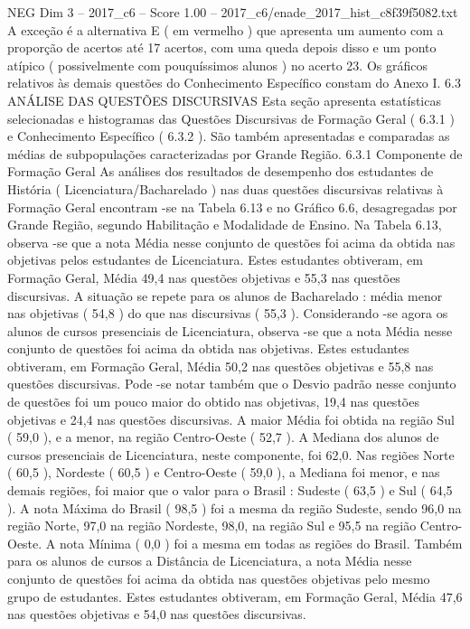 \begin{textsample}{NEG Dim 3 – 2017\_c6 – Score 1.00 – 2017\_c6/enade\_2017\_hist\_c8f39f5082.txt}
A exceção é a alternativa E ( em vermelho ) que apresenta um aumento com a proporção de acertos até 17 acertos, com uma queda depois disso e um ponto atípico ( possivelmente com pouquíssimos alunos ) no acerto 23.
Os gráficos relativos às demais questões do Conhecimento Específico constam do Anexo I. 6.3 ANÁLISE DAS QUESTÕES DISCURSIVAS Esta seção apresenta estatísticas selecionadas e histogramas das Questões Discursivas de Formação Geral ( 6.3.1 ) e Conhecimento Específico ( 6.3.2 ).
São também apresentadas e comparadas as médias de subpopulações caracterizadas por Grande Região. 6.3.1 Componente de Formação Geral As análises dos resultados de desempenho dos estudantes de História ( Licenciatura/Bacharelado ) nas duas questões discursivas relativas à Formação Geral encontram -se na Tabela 6.13 e no Gráfico 6.6, desagregadas por Grande Região, segundo Habilitação e Modalidade de Ensino.
Na Tabela 6.13, observa -se que a nota Média nesse conjunto de questões foi acima da obtida nas objetivas pelos estudantes de Licenciatura.
Estes estudantes obtiveram, em Formação Geral, Média 49,4 nas questões objetivas e 55,3 nas questões discursivas.
A situação se repete para os alunos de Bacharelado : média menor nas objetivas ( 54,8 ) do que nas discursivas ( 55,3 ).
Considerando -se agora os alunos de cursos presenciais de Licenciatura, observa -se que a nota Média nesse conjunto de questões foi acima da obtida nas objetivas.
Estes estudantes obtiveram, em Formação Geral, Média 50,2 nas questões objetivas e 55,8 nas questões discursivas.
Pode -se notar também que o Desvio padrão nesse conjunto de questões foi um pouco maior do obtido nas objetivas, 19,4 nas questões objetivas e 24,4 nas questões discursivas.
A maior Média foi obtida na região Sul ( 59,0 ), e a menor, na região Centro-Oeste ( 52,7 ).
A Mediana dos alunos de cursos presenciais de Licenciatura, neste componente, foi 62,0.
Nas regiões Norte ( 60,5 ), Nordeste ( 60,5 ) e Centro-Oeste ( 59,0 ), a Mediana foi menor, e nas demais regiões, foi maior que o valor para o Brasil : Sudeste ( 63,5 ) e Sul ( 64,5 ).
A nota Máxima do Brasil ( 98,5 ) foi a mesma da região Sudeste, sendo 96,0 na região Norte, 97,0 na região Nordeste, 98,0, na região Sul e 95,5 na região Centro-Oeste.
A nota Mínima ( 0,0 ) foi a mesma em todas as regiões do Brasil.
Também para os alunos de cursos a Distância de Licenciatura, a nota Média nesse conjunto de questões foi acima da obtida nas questões objetivas pelo mesmo grupo de estudantes.
Estes estudantes obtiveram, em Formação Geral, Média 47,6 nas questões objetivas e 54,0 nas questões discursivas.

\end{textsample}
